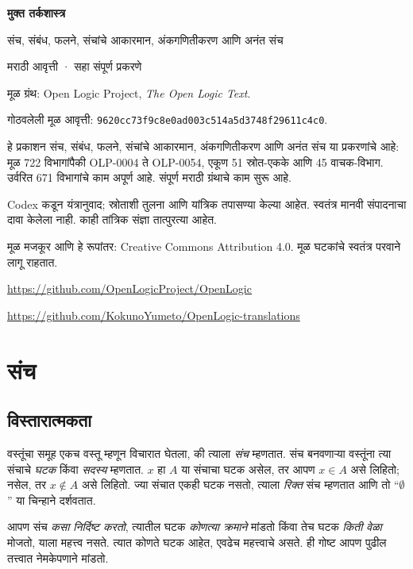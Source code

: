 \documentclass[11pt,a4paper,openany]{book}
\theoremstyle{definition}
\newenvironment{explain}{}{}
\begin{document}
\begin{titlepage}
\vspace*{2cm}
{\Huge\bfseries मुक्त तर्कशास्त्र\par}
\vspace{1cm}
{\LARGE संच, संबंध, फलने, संचांचे आकारमान, अंकगणितीकरण आणि अनंत संच\par}
\vspace{1cm}
{\large मराठी आवृत्ती · सहा संपूर्ण प्रकरणे\par}
\vfill
मूळ ग्रंथ: Open Logic Project, \textit{The Open Logic Text}.\par
गोठवलेली मूळ आवृत्ती: \texttt{9620cc73f9c8e0ad003c514a5d3748f29611c4c0}.\par
हे प्रकाशन संच, संबंध, फलने, संचांचे आकारमान, अंकगणितीकरण आणि अनंत संच या प्रकरणांचे आहे: मूळ 722 विभागांपैकी OLP-0004 ते OLP-0054, एकूण 51 स्रोत-एकके आणि 45 वाचक-विभाग. उर्वरित 671 विभागांचे काम अपूर्ण आहे.
संपूर्ण मराठी ग्रंथाचे काम सुरू आहे.\par
Codex कडून यंत्रानुवाद; स्रोताशी तुलना आणि यांत्रिक तपासण्या केल्या आहेत.
स्वतंत्र मानवी संपादनाचा दावा केलेला नाही. काही तांत्रिक संज्ञा तात्पुरत्या आहेत.\par
मूळ मजकूर आणि हे रूपांतर: Creative Commons Attribution 4.0.
मूळ घटकांचे स्वतंत्र परवाने लागू राहतात.\par
\url{https://github.com/OpenLogicProject/OpenLogic}\par
\url{https://github.com/KokunoYumeto/OpenLogic-translations}
\end{titlepage}
\tableofcontents
\chapter{संच}








\section{विस्तारात्मकता}\label{sfr:set:bas:sec}

वस्तूंचा समूह एकच वस्तू {म्हणून} विचारात घेतला, की त्याला \emph{संच} म्हणतात.
संच बनवणाऱ्या वस्तूंना त्या संचाचे \emph{घटक} किंवा \emph{सदस्य} म्हणतात.
$x$ हा $A$ या संचाचा घटक असेल, तर आपण $x \in A$ असे लिहितो;
नसेल, तर $x \notin A$ असे लिहितो. ज्या संचात एकही घटक नसतो,
त्याला \emph{रिक्त} संच म्हणतात आणि तो ``$\emptyset$'' या चिन्हाने दर्शवतात.

\begin{explain}
आपण संच \emph{कसा निर्दिष्ट करतो}, त्यातील घटक \emph{कोणत्या क्रमाने}
मांडतो किंवा तेच घटक \emph{किती वेळा} मोजतो, याला महत्त्व नसते.
त्यात कोणते घटक आहेत, एवढेच महत्त्वाचे असते. ही गोष्ट आपण पुढील
तत्त्वात नेमकेपणाने मांडतो.
\end{explain}
\end{document}
